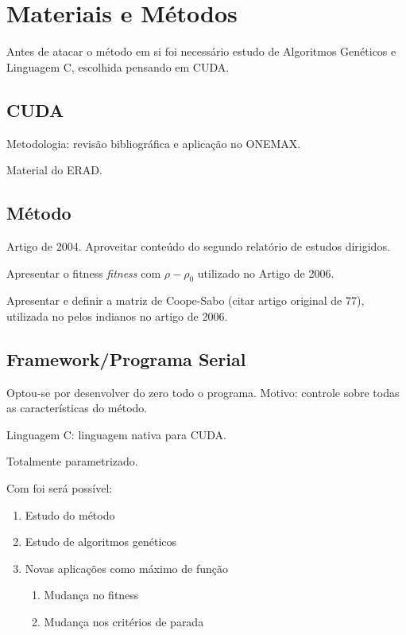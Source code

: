 \chapter{Materiais e Métodos}
\label{cap:metodologia}

Antes de atacar o método em si foi necessário estudo de Algoritmos Genéticos e Linguagem C, escolhida pensando em CUDA.

\section{CUDA}

Metodologia: revisão bibliográfica e aplicação no ONEMAX.

Material do ERAD.

\section{Método\label{sec:metodo}}

	Artigo de 2004.	Aproveitar conteúdo do segundo relatório de estudos dirigidos.

	Apresentar o fitness \textit{fitness} com $\rho - \rho_0$ utilizado no Artigo de 2006.

	Apresentar e definir a matriz de Coope-Sabo (citar artigo original de 77), utilizada no pelos indianos no artigo de 2006.
	
\section{Framework/Programa Serial}

	Optou-se por desenvolver do zero todo o programa. Motivo: controle sobre todas as características do método.

	Linguagem C: linguagem nativa para CUDA.

	Totalmente parametrizado. 

	Com foi será possível:

	\begin{enumerate}
		\item Estudo do método 
		\item Estudo de algoritmos genéticos
		\item Novas aplicações como máximo de função
		\begin{enumerate}
			\item Mudança no fitness 
			\item Mudança nos critérios de parada
		\end{enumerate}	
	\end{enumerate}


